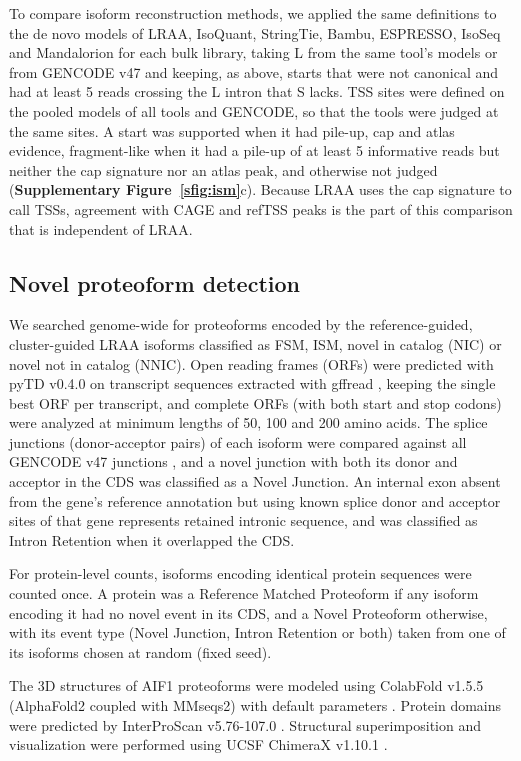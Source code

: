 To compare isoform reconstruction methods, we applied the same definitions to the de novo models of LRAA, IsoQuant, StringTie, Bambu, ESPRESSO, IsoSeq and Mandalorion for each bulk library, taking L from the same tool's models or from GENCODE v47 and keeping, as above, starts that were not canonical and had at least 5 reads crossing the L intron that S lacks. TSS sites were defined on the pooled models of all tools and GENCODE, so that the tools were judged at the same sites. A start was supported when it had pile-up, cap and atlas evidence, fragment-like when it had a pile-up of at least 5 informative reads but neither the cap signature nor an atlas peak, and otherwise not judged (\textbf{Supplementary Figure~\ref{sfig:ism}}c). Because LRAA uses the cap signature to call TSSs, agreement with CAGE and refTSS peaks is the part of this comparison that is independent of LRAA.

\subsection{Novel proteoform detection}\label{novel-proteoform-detection}

We searched genome-wide for proteoforms encoded by the reference-guided, cluster-guided LRAA isoforms classified as FSM, ISM, novel in catalog (NIC) or novel not in catalog (NNIC). Open reading frames (ORFs) were predicted with pyTD v0.4.0 \citep{pytransdecoder} on transcript sequences extracted with gffread \citep{pertea2020}, keeping the single best ORF per transcript, and complete ORFs (with both start and stop codons) were analyzed at minimum lengths of 50, 100 and 200 amino acids. The splice junctions (donor-acceptor pairs) of each isoform were compared against all GENCODE v47 junctions \citep{gencodendb}, and a novel junction with both its donor and acceptor in the CDS was classified as a Novel Junction. An internal exon absent from the gene's reference annotation but using known splice donor and acceptor sites of that gene represents retained intronic sequence, and was classified as Intron Retention when it overlapped the CDS.

For protein-level counts, isoforms encoding identical protein sequences were counted once. A protein was a Reference Matched Proteoform if any isoform encoding it had no novel event in its CDS, and a Novel Proteoform otherwise, with its event type (Novel Junction, Intron Retention or both) taken from one of its isoforms chosen at random (fixed seed).

The 3D structures of AIF1 proteoforms were modeled using ColabFold v1.5.5 (AlphaFold2 coupled with MMseqs2) with default parameters \citep{mirdita2022}. Protein domains were predicted by InterProScan v5.76-107.0 \citep{jones2014}. Structural superimposition and visualization were performed using UCSF ChimeraX v1.10.1 \citep{meng2023}.

